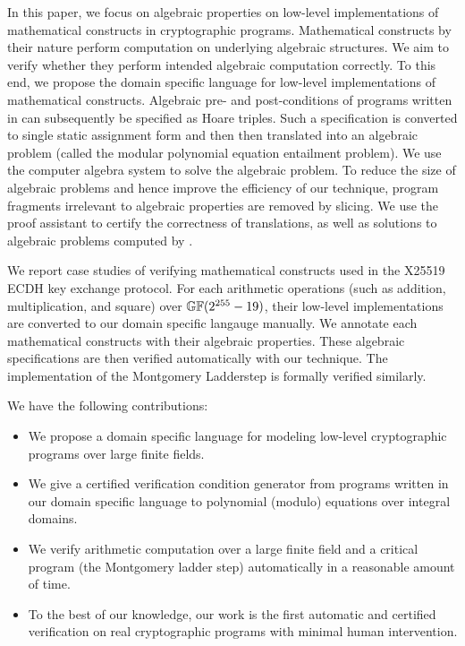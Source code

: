 In this paper, we focus on algebraic properties on low-level
implementations of mathematical constructs in cryptographic programs.
Mathematical constructs by their nature perform computation on
underlying algebraic structures. We aim to verify whether they perform
intended algebraic computation correctly. To this end, we propose the
domain specific language \mydsl for low-level implementations of
mathematical constructs. Algebraic pre- and post-conditions of
programs written in \mydsl can subsequently be specified as Hoare
triples. Such a specification is converted to single static assignment
form and then then translated into an algebraic problem (called the
modular polynomial equation entailment problem). We use the computer
algebra system \singular to solve the algebraic problem. To reduce the
size of algebraic problems and hence improve the efficiency of our
technique, program fragments irrelevant to algebraic properties are
removed by slicing. We use the proof assistant \coq to certify the
correctness of translations, as well as solutions to algebraic
problems computed by \singular.

We report case studies of verifying mathematical constructs used in
the X25519 ECDH key exchange protocol. For each arithmetic operations
(such as addition, multiplication, and square) over $\mathbb{GF}(2^{255} - 19)$,
their low-level \qhasm implementations are converted to our domain
specific langauge \mydsl manually. We annotate each mathematical
constructs with their algebraic properties. These algebraic
specifications are then verified automatically with our technique. 
The \qhasm implementation of the Montgomery Ladderstep is formally
verified similarly.  



We have the following contributions:
\begin{itemize}
\item We propose a domain specific language for modeling low-level
  cryptographic programs over large finite fields.
\item We give a certified verification condition generator from
  programs written in our domain specific language to polynomial
  (modulo) equations over integral domains.
\item We verify arithmetic computation over a large finite field and a
  critical program (the Montgomery ladder step) automatically in a
  reasonable amount of time.  
\item To the best of our knowledge, our work is the first automatic
  and certified verification on real cryptographic programs with
  minimal human intervention.
\end{itemize}

